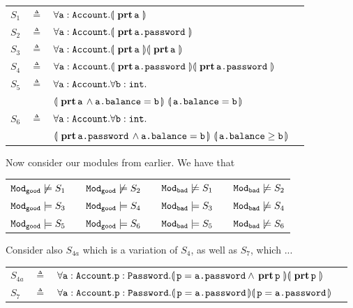 \begin{tabular}{lcll}
$S_1$   &     $\triangleq$   & $\OneStateQ{\prg{a}:\prg{Account} } {\inside{\prg{a}}} $
 \\
 $S_2$   &     $\triangleq$   & $\OneStateQ{\prg{a}:\prg{Account} } {\inside{\prg{a.password}}} $
 \\
 $S_3$   & $\triangleq$   &  $\TwoStatesQ {\prg{a}:\prg{Account}}  {\inside{\prg{a}}} {\inside{\prg{a}}} $
 \\
 $S_4$   & $\triangleq$   &  $\TwoStatesQ {\prg{a}:\prg{Account}}  {\inside{\prg{a.password}}} {\inside{\prg{a.password}}}$
 \\
$S_5$ & $\triangleq$   &
 $\forall \prg{a}:\prg{Account}.\forall \prg{b}:\prg{int}.$\\
  &  &  $\FirstState{\inside{\prg{a}} \wedge \prg{a.balance}=\prg{b}} 
\  \SecondState{ \prg{a.balance}= \prg{b} }$
\\
$S_6$ & $\triangleq$   &
  $\forall \prg{a}:\prg{Account}.\forall \prg{b}:\prg{int}.$\\
  &  &  $\FirstState{\inside{\prg{a.password}} \wedge \prg{a.balance}=\prg{b}} 
\  \SecondState{ \prg{a.balance}\geq \prg{b} }$
 \end{tabular}

\vspace{.2cm}
Now consider our modules from earlier. We have that

\begin{tabular}{lllllll}
$\ModA \not\models S_1$  & & $\ModA \not\models S_2$ &&  $\ModB \not\models S_1$ &  &$\ModB \not\models S_2$ \\
$\ModA \models S_3$ & &   $\ModA \models S_4$ & &  $\ModB  \models S_3$ & &  $\ModB  \not\models S_4$ \\
$\ModA \models S_5$ & &  $\ModA \models S_6$ & & $\ModB  \models S_5$ & & $\ModB   \not\models S_6$ \\
\end{tabular}

\vspace{.6cm}
Consider also  $S_{4a}$ which is a variation of $S_4$, as well as $S_7$, which ...

\begin{tabular}{lcll}
$S_{4a}$   &     $\triangleq$   &   ${\TwoStatesQ {\prg{a}:\prg{Account}.\prg{p}:\prg{Password}}  {\prg{p}=\prg{a.password} \wedge \inside{\prg{p}}}{\inside{\prg{p}}} }$
 \\
$S_7$ & $\triangleq$   & ${\TwoStatesQ {\prg{a}:\prg{Account}.\prg{p}:\prg{Password}}  {\prg{p}=\prg{a.password}} {\prg{p}=\prg{a.password}} }$
 \end{tabular}
 
